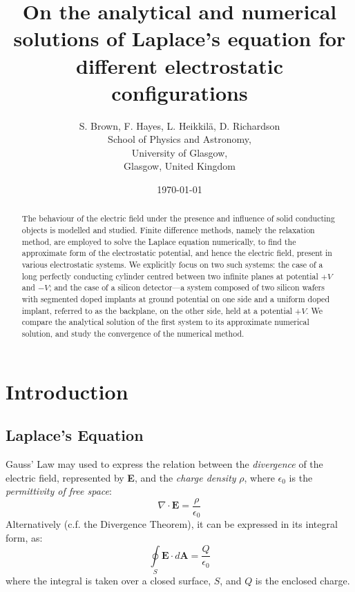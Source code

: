 \documentclass[12pt, a4paper]{article}
\newcommand{\be}{\begin{equation}}
\newcommand{\ee}{\end{equation}}
\begin{document}
\title{On the analytical and numerical solutions of Laplace's equation for different electrostatic configurations}
\author{S. Brown, F. Hayes, L. Heikkil{\"a}, D. Richardson\\
	School of Physics and Astronomy,\\
	University of Glasgow,\\
	Glasgow, United Kingdom}
\date{\today}
\maketitle

\begin{abstract}

The behaviour of the electric field under the presence and influence of solid
conducting objects is modelled and studied. Finite difference methods, namely the
relaxation method, are employed to solve the Laplace equation numerically,
to find the approximate form of the electrostatic potential, and hence the electric
field, present in various electrostatic systems. We explicitly focus on two such
systems: the case of a long perfectly conducting cylinder centred between two infinite
planes at potential $+V$ and $-V$; and the case of a silicon detector---a system
composed of two silicon wafers with segmented doped implants at ground potential on one
side and a uniform doped implant, referred to as the backplane, on the other side, held
at a potential $+V$. We compare the analytical solution of the first system to its
approximate numerical solution, and study the convergence of the numerical method.

\end{abstract} %

\section{Introduction}
\subsection{Laplace's Equation}

Gauss' Law may used to express the relation between the \emph{divergence} of the
electric field, represented by \textbf{E}, and the \emph{charge density} $\rho$,
where $\epsilon_0$ is the \emph{permittivity of free space}:
%
\be
\nabla \cdot \bm{E} = \frac{\rho}{\epsilon_0}
\ee
%
Alternatively (c.f. the Divergence Theorem), it can be expressed in its
integral form, as:
%
\be
\oint \limits_S \bm{E} \cdot d\bm{A} = \frac{Q}{\epsilon_0}
\ee
%
where the integral is taken over a closed surface, $S$, and $Q$ is the enclosed charge.
\end{document}
